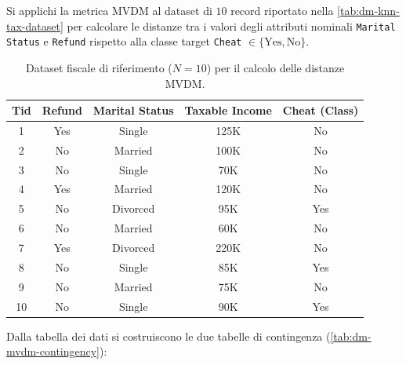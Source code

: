 \begin{example}
Si applichi la metrica MVDM al dataset di $10$ record riportato nella \autoref{tab:dm-knn-tax-dataset} per calcolare le distanze tra i valori degli attributi nominali \texttt{Marital Status} e \texttt{Refund} rispetto alla classe target \texttt{Cheat} $\in \{\text{Yes}, \text{No}\}$.

\begin{table}[H]
\centering
\caption{Dataset fiscale di riferimento ($N = 10$) per il calcolo delle distanze MVDM.}
\label{tab:dm-knn-tax-dataset}
\small
\begin{tabular}{ccccc}
\toprule
\textbf{Tid} & \textbf{Refund} & \textbf{Marital Status} & \textbf{Taxable Income} & \textbf{Cheat (Class)} \\
\midrule
1  & Yes & Single   & 125K & No \\
2  & No  & Married  & 100K & No \\
3  & No  & Single   & 70K  & No \\
4  & Yes & Married  & 120K & No \\
5  & No  & Divorced & 95K  & Yes \\
6  & No  & Married  & 60K  & No \\
7  & Yes & Divorced & 220K & No \\
8  & No  & Single   & 85K  & Yes \\
9  & No  & Married  & 75K  & No \\
10 & No  & Single   & 90K  & Yes \\
\bottomrule
\end{tabular}
\end{table}

Dalla tabella dei dati si costruiscono le due tabelle di contingenza (\autoref{tab:dm-mvdm-contingency}):

\begin{table}[H]
\centering
\caption{Tabelle di contingenza per \texttt{Marital Status} e \texttt{Refund} rispetto alla classe \texttt{Cheat}.}
\label{tab:dm-mvdm-contingency}
\small
{}
\end{table}


\end{example}
